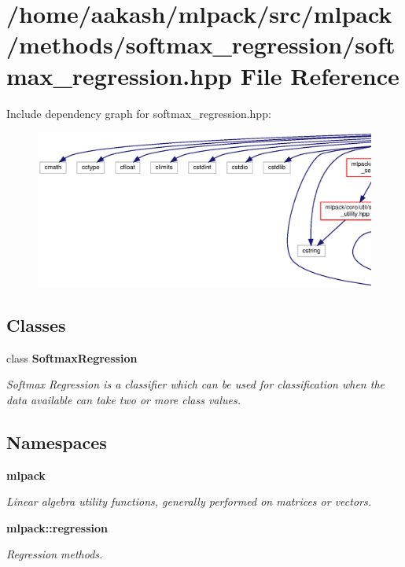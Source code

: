 \section{/home/aakash/mlpack/src/mlpack/methods/softmax\+\_\+regression/softmax\+\_\+regression.hpp File Reference}
\label{softmax__regression_8hpp}
Include dependency graph for softmax\+\_\+regression.\+hpp\+:
\nopagebreak
\begin{figure}[H]
\begin{center}
\leavevmode
\includegraphics[width=350pt]{softmax__regression_8hpp__incl}
\end{center}
\end{figure}
\subsection*{Classes}
\begin{DoxyCompactItemize}
\item 
class \textbf{ Softmax\+Regression}
\begin{DoxyCompactList}\small\item\em Softmax Regression is a classifier which can be used for classification when the data available can take two or more class values. \end{DoxyCompactList}\end{DoxyCompactItemize}
\subsection*{Namespaces}
\begin{DoxyCompactItemize}
\item 
 \textbf{ mlpack}
\begin{DoxyCompactList}\small\item\em Linear algebra utility functions, generally performed on matrices or vectors. \end{DoxyCompactList}\item 
 \textbf{ mlpack\+::regression}
\begin{DoxyCompactList}\small\item\em Regression methods. \end{DoxyCompactList}\end{DoxyCompactItemize}


